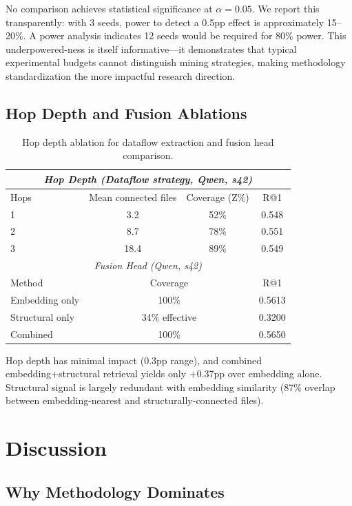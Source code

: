 \documentclass[11pt]{article}
\begin{document}
No comparison achieves statistical significance at $\alpha=0.05$. We report this transparently: with 3 seeds, power to detect a 0.5pp effect is approximately 15--20\%. A power analysis indicates 12 seeds would be required for 80\% power. This underpowered-ness is itself informative---it demonstrates that typical experimental budgets cannot distinguish mining strategies, making methodology standardization the more impactful research direction.

\subsection{Hop Depth and Fusion Ablations}

\begin{table}[h]
\centering
\caption{Hop depth ablation for dataflow extraction and fusion head comparison.}
\label{tab:ablation}
\begin{tabular}{p{4cm}ccc}
\toprule
\multicolumn{4}{c}{\textit{Hop Depth (Dataflow strategy, Qwen, s42)}} \\
\midrule
Hops & Mean connected files & Coverage (Z\%) & R@1 \\
\midrule
1 & 3.2 & 52\% & 0.548 \\
2 & 8.7 & 78\% & 0.551 \\
3 & 18.4 & 89\% & 0.549 \\
\midrule
\multicolumn{4}{c}{\textit{Fusion Head (Qwen, s42)}} \\
\midrule
Method & \multicolumn{2}{c}{Coverage} & R@1 \\
\midrule
Embedding only & \multicolumn{2}{c}{100\%} & 0.5613 \\
Structural only & \multicolumn{2}{c}{34\% effective} & 0.3200 \\
Combined & \multicolumn{2}{c}{100\%} & 0.5650 \\
\bottomrule
\end{tabular}
\end{table}

Hop depth has minimal impact (0.3pp range), and combined embedding+structural retrieval yields only $+$0.37pp over embedding alone. Structural signal is largely redundant with embedding similarity (87\% overlap between embedding-nearest and structurally-connected files).

\section{Discussion}

\subsection{Why Methodology Dominates}
\end{document}
